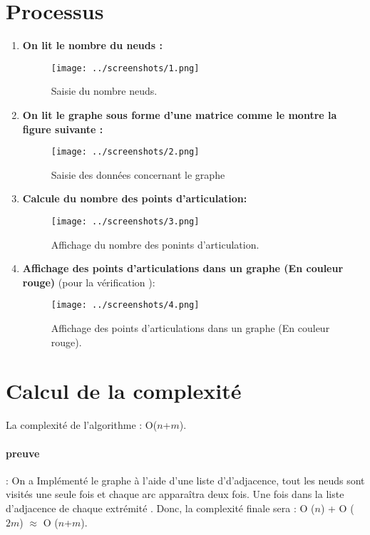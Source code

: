 \documentclass[12pt]{report}
\begin{document}
	\section{Processus}
	\begin{enumerate}
		\item \textbf{On lit le nombre du neuds :}
		\begin{figure}[h!]
	\centering
\texttt{[image: ../screenshots/1.png]}
	\caption{Saisie du nombre neuds.}	
	\end{figure}
\FloatBarrier
		\item \textbf{On lit le graphe  sous forme d'une matrice comme le montre la figure suivante :}
			\begin{figure}[h!]
	\centering
\texttt{[image: ../screenshots/2.png]}
	\caption{Saisie des données concernant le graphe}
	\end{figure}
	\FloatBarrier
	\item \textbf{Calcule du nombre des points d'articulation:}
	\begin{figure}[h!]
		\centering
		\texttt{[image: ../screenshots/3.png]}
		\caption{Affichage du nombre des ponints d'articulation. }
	\end{figure}
	\FloatBarrier
	\item \textbf{Affichage des points d'articulations dans un graphe (En couleur rouge)} (pour la vérification ):
	\begin{figure}[h!]
		\centering
		\texttt{[image: ../screenshots/4.png]}
		\caption{Affichage des points d'articulations dans un graphe (En couleur rouge).}
	\end{figure}
	\FloatBarrier
\end{enumerate}	
	
	
	\section{Calcul de la complexité}
	\par{} 
	La complexité de l'algorithme : O($n$+$m$).	
	\paragraph*{preuve}:
	On a Implémenté le graphe à l'aide d'une liste d'd'adjacence, tout les neuds sont visités une seule fois et chaque arc apparaîtra deux fois. Une fois dans la liste d'adjacence de chaque extrémité  . Donc, la complexité finale sera : \newline 
	{ O ($n$) + O ($2m$) $\approx$ O ($n$+$m$).}
\end{document}
